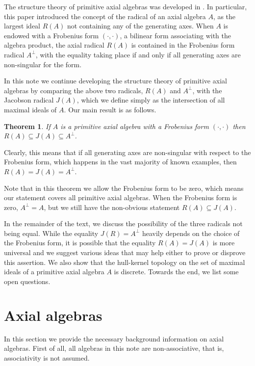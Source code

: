 \documentclass[12pt]{article}
\newtheorem{theorem}{Theorem}[section]
\begin{document}
The structure theory of primitive axial algebras was developed in \cite{kms}. In 
particular, this paper introduced the concept of the radical of an axial algebra $A$, 
as the largest ideal $R(A)$ not containing any of the generating axes. When $A$ 
is endowed with a Frobenius form $(\cdot,\cdot)$, a bilinear form associating with the algebra 
product, the axial radical $R(A)$ is contained in the Frobenius form radical 
$A^\perp$, with the equality taking place if and only if all generating axes are 
non-singular for the form. 

In this note we continue developing the structure theory of primitive axial algebras 
by comparing the above two radicals, $R(A)$ and $A^\perp$, with the Jacobson radical 
$J(A)$, which we define simply as the intersection of all maximal ideals of $A$. 
Our main result is as follows.

\begin{theorem} \label{main}
If $A$ is a primitive axial algebra with a Frobenius form $(\cdot,\cdot)$ then 
$R(A)\subseteq J(A)\subseteq A^\perp$.
\end{theorem}

Clearly, this means that if all generating axes are non-singular with respect to the 
Frobenius form, which happens in the vast majority of known examples, then 
$R(A)=J(A)=A^\perp$.

Note that in this theorem we allow the Frobenius form to be zero, which means our statement covers all primitive axial algebras. When the Frobenius form is zero, $A^\perp=A$, but we still have the non-obvious statement $R(A)\subseteq J(A)$.

\medskip
%
In the remainder of the text, we discuss the possibility of the three radicals not 
being equal. While the equality $J(R)=A^\perp$ heavily depends on the choice of the 
Frobenius form, it is possible that the equality $R(A)=J(A)$ is more universal and we 
suggest various ideas that may help either to prove or disprove this assertion. We 
also show that the hull-kernel topology on the set of maximal ideals of a primitive 
axial algebra $A$ is discrete. Towards the end, we list some open questions.

\section{Axial algebras} \label{axial algebras}

In this section we provide the necessary background information on axial algebras. 
First of all, all algebras in this note are non-associative, that is, associativity 
is not assumed. 
\end{document}
